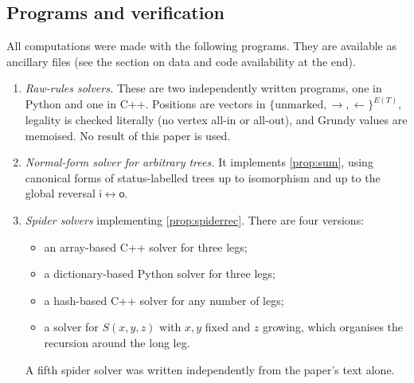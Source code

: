 \documentclass[11pt]{amsart}
\theoremstyle{definition}
\theoremstyle{remark}
\newcommand{\si}{\mathsf{i}}
\newcommand{\so}{\mathsf{o}}
\newcommand{\Sp}{S}
\begin{document}
\subsection{Programs and verification}\label{sec:programs}
All computations were made with the following programs. They are available as ancillary files (see the section on data and code availability at the end).
\begin{enumerate}[label=(P\arabic*),leftmargin=*]
\item \emph{Raw-rules solvers.} These are two independently written programs, one in Python and one in C++. Positions are vectors in $\{\text{unmarked},\to,\leftarrow\}^{E(T)}$, legality is checked literally (no vertex all-in or all-out), and Grundy values are memoised. No result of this paper is used.
\item \emph{Normal-form solver for arbitrary trees.} It implements \cref{prop:sum}, using canonical forms of status-labelled trees up to isomorphism and up to the global reversal $\si\leftrightarrow\so$.
\item \emph{Spider solvers} implementing \cref{prop:spiderrec}. There are four versions:
\begin{itemize}[leftmargin=*]
\item an array-based C++ solver for three legs;
\item a dictionary-based Python solver for three legs;
\item a hash-based C++ solver for any number of legs;
\item a solver for $\Sp(x,y,z)$ with $x,y$ fixed and $z$ growing, which organises the recursion around the long leg.
\end{itemize}
A fifth spider solver was written independently from the paper's text alone.
\end{enumerate}
\end{document}
